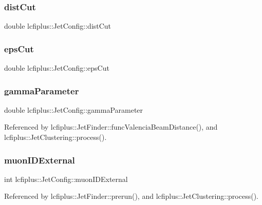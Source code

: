 \mbox{\label{structlcfiplus_1_1JetConfig_ad27d267d65150ef585f0e2f2201558cd}} 
\subsubsection{dist\+Cut}
{\footnotesize\ttfamily double lcfiplus\+::\+Jet\+Config\+::dist\+Cut}

\mbox{\label{structlcfiplus_1_1JetConfig_accffa8d0573c78f582d1c880ce880f6e}} 
\subsubsection{eps\+Cut}
{\footnotesize\ttfamily double lcfiplus\+::\+Jet\+Config\+::eps\+Cut}

\mbox{\label{structlcfiplus_1_1JetConfig_a085ff885cbaac18553611e9485b2beda}} 
\subsubsection{gamma\+Parameter}
{\footnotesize\ttfamily double lcfiplus\+::\+Jet\+Config\+::gamma\+Parameter}



Referenced by lcfiplus\+::\+Jet\+Finder\+::func\+Valencia\+Beam\+Distance(), and lcfiplus\+::\+Jet\+Clustering\+::process().

\mbox{\label{structlcfiplus_1_1JetConfig_a1e99ac7973ecfe3dac2fa668f29cd1a4}} 
\subsubsection{muon\+I\+D\+External}
{\footnotesize\ttfamily int lcfiplus\+::\+Jet\+Config\+::muon\+I\+D\+External}



Referenced by lcfiplus\+::\+Jet\+Finder\+::prerun(), and lcfiplus\+::\+Jet\+Clustering\+::process().

